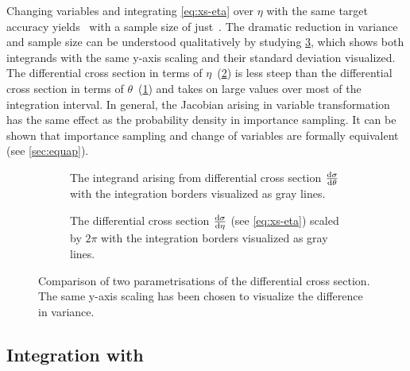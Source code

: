 Changing variables and integrating \cref{eq:xs-eta} over \(\eta\) with
the same target accuracy yields~ with a
sample size of just~. The dramatic
reduction in variance and sample size can be understood qualitatively
by studying \cref{fig:xs-int-comp}, which shows both integrands with
the same y-axis scaling and their standard deviation visualized. The
differential cross section in terms of
\(\eta\)~(\cref{fig:xs-int-eta}) is less steep than the differential
cross section in terms of \(\theta\)~(\cref{fig:xs-int-theta}) and
takes on large values over most of the integration interval. In
general, the Jacobian arising in variable transformation has the same
effect as the probability density in importance sampling. It can be
shown that importance sampling and change of variables are formally
equivalent (see \ref{sec:equap}).
%
\begin{figure}[ht]
  \centering
  \begin{subfigure}[c]{.49\textwidth}
    \caption[\(2\pi\dv{\sigma}{\theta}\) with integration
    boundaries]{\label{fig:xs-int-theta} The integrand arising from
      differential cross section \(\dv{\sigma}{\theta}\) with the
      integration borders visualized as gray lines.}
  \end{subfigure}
  \begin{subfigure}[c]{.49\textwidth}
    \caption[Differential cross section for \(\qqgg\) with integration
    boundaries]{\label{fig:xs-int-eta} The differential cross section
      \(\dv{\sigma}{\eta}\) (see \cref{eq:xs-eta}) scaled by \(2\pi\)
      with the integration borders visualized as gray lines.}
  \end{subfigure}
  \caption{\label{fig:xs-int-comp} Comparison of two parametrisations
    of the differential cross section. The same y-axis scaling has
    been chosen to visualize the difference in variance.}
\end{figure}
%
\subsection{Integration with \vegas}
\label{sec:mcintvegas}

